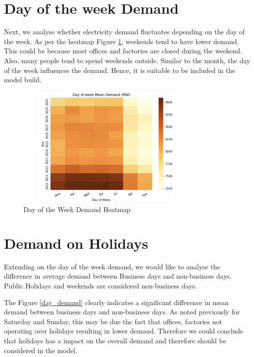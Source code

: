 \documentclass[mstat,12pt]{unswthesis}
\begin{document}
\section{Day of the week Demand}\label{day-of-the-week-demand}

Next, we analyse whether electricity demand fluctuates depending on the
day of the week. As per the heatmap Figure \ref{day_heat}, weekends tend
to have lower demand. This could be because most offices and factories
are closed during the weekend. Also, many people tend to spend weekends
outside. Similar to the month, the day of the week influences the
demand. Hence, it is suitable to be included in the model build.

\begin{figure}[H]
\centering
\includegraphics[width=0.80\textwidth,height=6cm]{day_heat.png}
\caption{Day of the Week Demand Heatmap}
\label{day_heat}
\end{figure}

\section{Demand on Holidays}\label{demand-on-holidays}

Extending on the day of the week demand, we would like to analyse the
difference in average demand between Business days and non-business
days. Public Holidays and weekends are considered non-business days.

The Figure \ref{day_demand} clearly indicates a significant difference
in mean demand between business days and non-business days. As noted
previously for Saturday and Sunday, this may be due the fact that
offices, factories not operating over holidays resulting in lower
demand. Therefore we could conclude that holidays has a impact on the
overall demand and therefore should be considered in the model.
\end{document}
